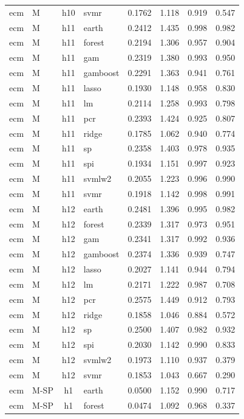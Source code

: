 \begin{ThreePartTable}
\begin{longtable}[t]{llclcccc}
ecm & M & h10 & svmr & 0.1762 & 1.118 & 0.919 & 0.547\\
\addlinespace
ecm & M & h11 & earth & 0.2412 & 1.435 & 0.998 & 0.982\\
ecm & M & h11 & forest & 0.2194 & 1.306 & 0.957 & 0.904\\
ecm & M & h11 & gam & 0.2319 & 1.380 & 0.993 & 0.950\\
ecm & M & h11 & gamboost & 0.2291 & 1.363 & 0.941 & 0.761\\
ecm & M & h11 & lasso & 0.1930 & 1.148 & 0.958 & 0.830\\
ecm & M & h11 & lm & 0.2114 & 1.258 & 0.993 & 0.798\\
ecm & M & h11 & pcr & 0.2393 & 1.424 & 0.925 & 0.807\\
ecm & M & h11 & ridge & 0.1785 & 1.062 & 0.940 & 0.774\\
ecm & M & h11 & sp & 0.2358 & 1.403 & 0.978 & 0.935\\
ecm & M & h11 & spi & 0.1934 & 1.151 & 0.997 & 0.923\\
ecm & M & h11 & svmlw2 & 0.2055 & 1.223 & 0.996 & 0.990\\
ecm & M & h11 & svmr & 0.1918 & 1.142 & 0.998 & 0.991\\
\addlinespace
ecm & M & h12 & earth & 0.2481 & 1.396 & 0.995 & 0.982\\
ecm & M & h12 & forest & 0.2339 & 1.317 & 0.973 & 0.951\\
ecm & M & h12 & gam & 0.2341 & 1.317 & 0.992 & 0.936\\
ecm & M & h12 & gamboost & 0.2374 & 1.336 & 0.939 & 0.747\\
ecm & M & h12 & lasso & 0.2027 & 1.141 & 0.944 & 0.794\\
ecm & M & h12 & lm & 0.2171 & 1.222 & 0.987 & 0.708\\
ecm & M & h12 & pcr & 0.2575 & 1.449 & 0.912 & 0.793\\
ecm & M & h12 & ridge & 0.1858 & 1.046 & 0.884 & 0.572\\
ecm & M & h12 & sp & 0.2500 & 1.407 & 0.982 & 0.932\\
ecm & M & h12 & spi & 0.2030 & 1.142 & 0.990 & 0.833\\
ecm & M & h12 & svmlw2 & 0.1973 & 1.110 & 0.937 & 0.379\\
ecm & M & h12 & svmr & 0.1853 & 1.043 & 0.667 & 0.290\\
\addlinespace
ecm & M-SP & h1 & earth & 0.0500 & 1.152 & 0.990 & 0.717\\
ecm & M-SP & h1 & forest & 0.0474 & 1.092 & 0.968 & 0.337\\

\end{longtable}
\end{ThreePartTable}
